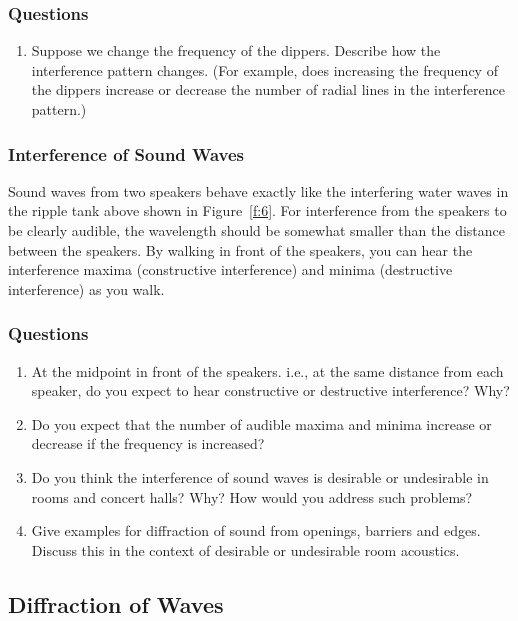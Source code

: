 \documentclass[11pt]{NSF}
\def\ben{\begin{enumerate}}
\def\een{\end{enumerate}}
\def\i{\item{}}
\begin{document}
\subsubsection*{Questions}

\ben
\i Suppose we change the frequency of the dippers.
Describe how the interference pattern changes.
(For example, does increasing the frequency of the 
dippers increase or decrease the number of radial 
lines in the interference pattern.)

\een

\subsubsection{Interference of Sound Waves}

Sound waves from two speakers behave exactly like the 
interfering water waves in the ripple tank above shown
in Figure~\ref{f:6}.
For interference from the speakers to be clearly audible, 
the wavelength should be somewhat smaller than the distance between the speakers.
By walking in front of the speakers, you can hear the
interference maxima (constructive interference) and 
minima (destructive interference) as you walk.

\subsubsection*{Questions}

\ben
\i At the midpoint in front of the speakers. i.e., at the 
same distance from each speaker, do you expect to hear 
constructive or destructive interference? Why?

\i Do you expect that the number of audible maxima and minima 
increase or decrease if the frequency is increased?

\i Do you think the interference of sound waves is desirable 
or undesirable in rooms and concert halls?  
Why? How would you address such problems?

\i Give examples for diffraction of sound from openings, barriers and edges. 
Discuss this in the context of desirable or undesirable room acoustics.

\een

\subsection{Diffraction of Waves}
\end{document}
